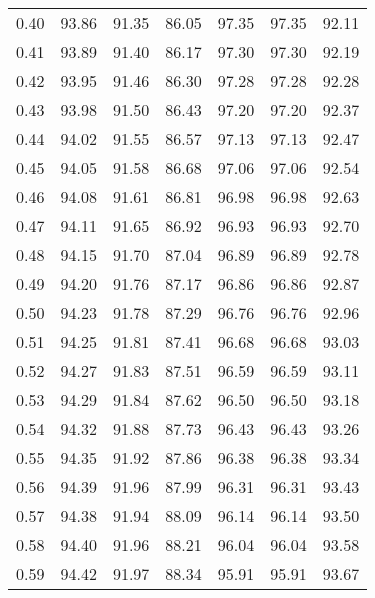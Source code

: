 \begin{tabular}{|c|c|c|c|c|c|c|}
      0.40 &     93.86 &     91.35 &      86.05 &   97.35 &      97.35 &         92.11 \\
      0.41 &     93.89 &     91.40 &      86.17 &   97.30 &      97.30 &         92.19 \\
      0.42 &     93.95 &     91.46 &      86.30 &   97.28 &      97.28 &         92.28 \\
      0.43 &     93.98 &     91.50 &      86.43 &   97.20 &      97.20 &         92.37 \\
      0.44 &     94.02 &     91.55 &      86.57 &   97.13 &      97.13 &         92.47 \\
      0.45 &     94.05 &     91.58 &      86.68 &   97.06 &      97.06 &         92.54 \\
      0.46 &     94.08 &     91.61 &      86.81 &   96.98 &      96.98 &         92.63 \\
      0.47 &     94.11 &     91.65 &      86.92 &   96.93 &      96.93 &         92.70 \\
      0.48 &     94.15 &     91.70 &      87.04 &   96.89 &      96.89 &         92.78 \\
      0.49 &     94.20 &     91.76 &      87.17 &   96.86 &      96.86 &         92.87 \\
      0.50 &     94.23 &     91.78 &      87.29 &   96.76 &      96.76 &         92.96 \\
      0.51 &     94.25 &     91.81 &      87.41 &   96.68 &      96.68 &         93.03 \\
      0.52 &     94.27 &     91.83 &      87.51 &   96.59 &      96.59 &         93.11 \\
      0.53 &     94.29 &     91.84 &      87.62 &   96.50 &      96.50 &         93.18 \\
      0.54 &     94.32 &     91.88 &      87.73 &   96.43 &      96.43 &         93.26 \\
      0.55 &     94.35 &     91.92 &      87.86 &   96.38 &      96.38 &         93.34 \\
      0.56 &     94.39 &     91.96 &      87.99 &   96.31 &      96.31 &         93.43 \\
      0.57 &     94.38 &     91.94 &      88.09 &   96.14 &      96.14 &         93.50 \\
      0.58 &     94.40 &     91.96 &      88.21 &   96.04 &      96.04 &         93.58 \\
      0.59 &     94.42 &     91.97 &      88.34 &   95.91 &      95.91 &         93.67 \\

\end{tabular}
